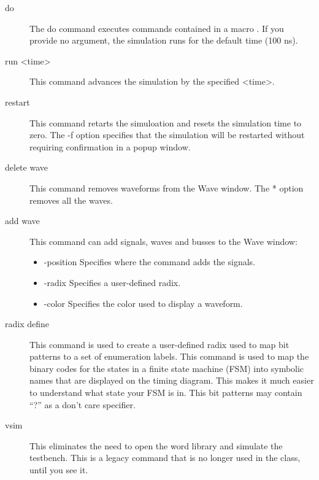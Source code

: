 \begin{description}
    \item[do ] The do command executes commands contained in a macro .
        If you provide no argument, the simulation runs for the default time (100 ns).

    \item[run <time>]This command advances the simulation by the specified <time>.

    \item [restart] This command retarts the simuloation and resets the simulation time to zero.
        The -f option specifies that the simulation will be restarted without requiring confirmation in a
        popup window.

    \item[delete wave] This command removes waveforms from the Wave window.  The * option
        removes all the waves.

    \item[add wave] This command can add signals, waves and busses to the Wave window:
        \begin{itemize}
            \item -position Specifies where the command adds the signals.
            \item  -radix Specifies a user-defined radix.
            \item  -color Specifies the color used to display a waveform.
        \end{itemize}

    \item [radix define] This command is used to create a user-defined radix used to
        map bit patterns to a set of enumeration labels.  This command is used to map the
        binary codes for the states in a finite state machine (FSM) into symbolic names that are
        displayed on the timing diagram.  This makes it much easier to understand what
        state your FSM is in.  This bit patterns may contain ``?'' as a don't care specifier.

    \item[vsim ] This eliminates the need to open the word library and simulate the testbench.
        This is a legacy command that is no longer used in the class, until you see it.

\end{description}
